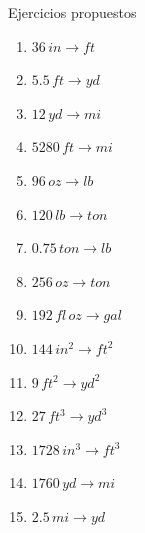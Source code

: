 \begin{frame}{Ejercicios propuestos}
\begin{multicols}{3}
\begin{enumerate}
    \item $\num{36} \,\unit{in}\rightarrow\unit{ft}$
    \item $\num{5.5} \,\unit{ft}\rightarrow\unit{yd}$
    \item $\num{12} \,\unit{yd}\rightarrow\unit{mi}$
    \item $\num{5280} \,\unit{ft}\rightarrow\unit{mi}$
    \item $\num{96} \,\unit{oz}\rightarrow\unit{lb}$
    \item $\num{120} \,\unit{lb}\rightarrow\unit{ton}$
    \item $\num{0.75} \,\unit{ton}\rightarrow\unit{lb}$
    \item $\num{256} \,\unit{oz}\rightarrow\unit{ton}$
    \item $\num{192} \,\unit{fl\,oz}\rightarrow\unit{gal}$
    \item $\num{144} \,\unit{in^2}\rightarrow\unit{ft^2}$
    \item $\num{9} \,\unit{ft^2}\rightarrow\unit{yd^2}$
    \item $\num{27} \,\unit{ft^3}\rightarrow\unit{yd^3}$
    \item $\num{1728} \,\unit{in^3}\rightarrow\unit{ft^3}$
    \item $\num{1760} \,\unit{yd}\rightarrow\unit{mi}$
    \item $\num{2.5} \,\unit{mi}\rightarrow\unit{yd}$
    \end{enumerate}
\end{multicols}
\end{frame}

